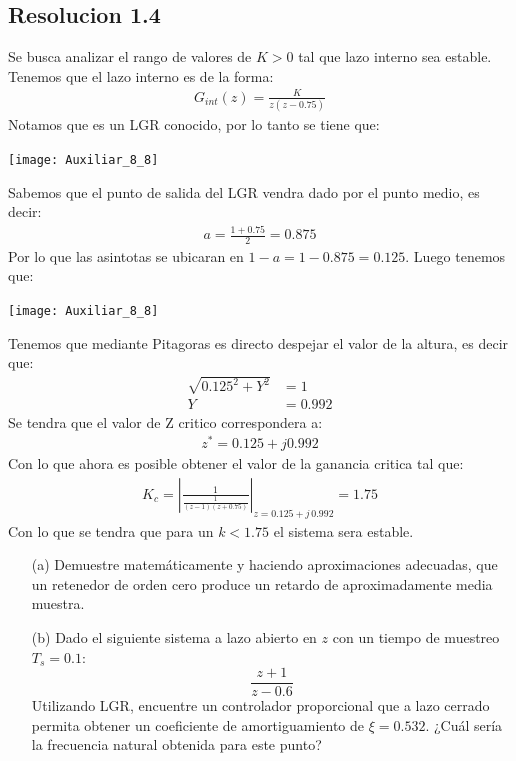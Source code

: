 \documentclass[
  11pt,
  letterpaper,
   addpoints,
  ]{exam}
\begin{document}
\begin{questions}
\begin{solution}
    \subsection*{Resolucion 1.4}
    Se busca analizar el rango de valores de $K > 0$ tal que lazo interno sea estable. Tenemos que el lazo interno es de la forma:
    \begin{align}
        G_{int}(z) = \frac{K}{z(z-0.75)}
    \end{align}
    Notamos que es un LGR conocido, por lo tanto se tiene que:
    \begin{center}
        \texttt{[image: Auxiliar\_8\_8]}
    \end{center}
    Sabemos que el punto de salida del LGR vendra dado por el punto medio, es decir:
    \begin{align}
        a= \frac{1+0.75}{2} = 0.875
    \end{align}
    Por lo que las asintotas se ubicaran en $1-a = 1-0.875 = 0.125$. Luego tenemos que:
    \begin{center}
        \texttt{[image: Auxiliar\_8\_8]}
    \end{center}
    Tenemos que mediante Pitagoras es directo despejar el valor de la altura, es decir que:
    \begin{align}
        \sqrt{0.125^{2} + Y^{2}} &= 1\\
        Y &= 0.992
    \end{align}
    Se tendra que el valor de Z critico correspondera a:
    \begin{align}
        z^{*} = 0.125 + j0.992
    \end{align}
    Con lo que ahora es posible obtener el valor de la ganancia critica tal que:
    \begin{align}
        K_{c} = \left| \frac{1}{\frac{1}{(z-1)(z+0.75)}}\right|_{z = 0.125 + j \, 0.992} = 1.75
    \end{align}
    Con lo que se tendra que para un $k< 1.75$ el sistema sera estable.
\end{solution}
    \question 
    \begin{enumerate}
        \item[(a)] Demuestre matemáticamente y haciendo aproximaciones adecuadas, que un retenedor de orden cero produce un retardo de aproximadamente media muestra.
        
        \item[(b)] Dado el siguiente sistema a lazo abierto en \( z \) con un tiempo de muestreo \( T_s = 0.1 \):
        \[
        \frac{z + 1}{z - 0.6}
        \tag{1}
        \]
        Utilizando LGR, encuentre un controlador proporcional que a lazo cerrado permita obtener un coeficiente de amortiguamiento de \( \xi = 0.532 \). ¿Cuál sería la frecuencia natural obtenida para este punto?
    \end{enumerate}
\begin{solution}

\end{solution}
\end{questions}
\end{document}
